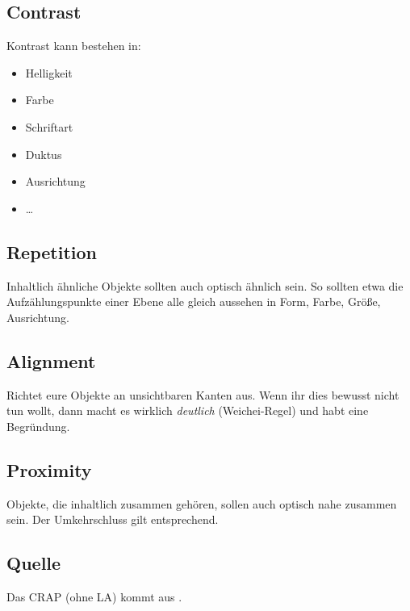 \subsection{Contrast}
Kontrast kann bestehen in:
\begin{itemize}
  \item Helligkeit
  \item Farbe
  \item Schriftart
  \item Duktus
  \item Ausrichtung
  \item \ldots
\end{itemize}

\subsection{Repetition}
Inhaltlich ähnliche Objekte sollten auch optisch ähnlich sein. So sollten etwa die Aufzählungspunkte einer Ebene alle gleich aussehen in Form, Farbe, Größe, Ausrichtung.

\subsection{Alignment}
Richtet eure Objekte an unsichtbaren Kanten aus. Wenn ihr dies bewusst nicht tun wollt, dann macht es wirklich \emph{deutlich} (Weichei-Regel) und habt eine Begründung.

\subsection{Proximity}
Objekte, die inhaltlich zusammen gehören, sollen auch optisch nahe zusammen sein. Der Umkehrschluss gilt entsprechend.

\subsection{Quelle}
Das CRAP (ohne LA) kommt aus \cite{non-designer}.